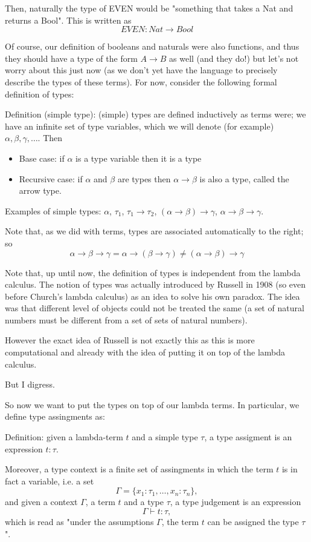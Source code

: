 Then, naturally the type of EVEN would be "something that takes a Nat and returns a Bool". This is written as
$$
EVEN : Nat \to Bool
$$

Of course, our definition of booleans and naturals were also functions, and thus they should have a type of the form $A \to B$ as well (and they do!) but let's not worry about this just now (as we don't yet have the language to precisely describe the types of these terms). For now, consider the following formal definition of types:

Definition (simple type): (simple) types are defined inductively as terms were; we have an infinite set of type variables, which we will denote (for example) $\alpha, \beta, \gamma, \dots$. Then
\begin{itemize}
  \item Base case: if $\alpha$ is a type variable then it is a type
  \item Recursive case: if $\alpha$ and $\beta$ are types then $\alpha \to \beta$ is also a type, called the arrow type.
\end{itemize}

Examples of simple types: $\alpha$, $\tau_1$, $\tau_1 \to \tau_2$, $(\alpha \to \beta) \to \gamma$, $\alpha \to \beta \to \gamma$.

Note that, as we did with terms, types are associated automatically to the right; so
$$
\alpha \to \beta \to \gamma = \alpha \to (\beta \to \gamma) \neq (\alpha \to \beta) \to \gamma
$$

Note that, up until now, the definition of types is independent from the lambda calculus. The notion of types was actually introduced by Russell in 1908 (so even before Church's lambda calculus) as an idea to solve his own paradox. The idea was that different level of objects could not be treated the same (a set of natural numbers must be different from a set of sets of natural numbers).

However the exact idea of Russell is not exactly this as this is more computational and already with the idea of putting it on top of the lambda calculus.

But I digress.

So now we want to put the types on top of our lambda terms. In particular, we define type assingments as:

Definition: given a lambda-term $t$ and a simple type $\tau$, a type assigment is an expression $t : \tau$.

Moreover, a type context is a finite set of assingments in which the term $t$ is in fact a variable, i.e. a set
$$
\Gamma = \{x_1 : \tau_1, \dots, x_n : \tau_n\},
$$
and given a context $\Gamma$, a term $t$ and a type $\tau$, a type judgement is an expression $$\Gamma \vdash t : \tau,$$ which is read as "under the assumptions $\Gamma$, the term $t$ can be assigned the type $\tau$".


